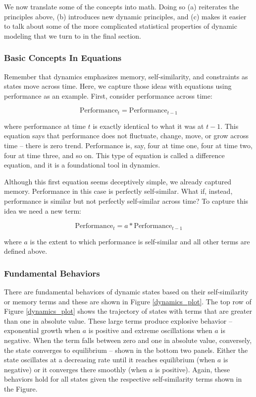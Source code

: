 \documentclass[english,,man]{apa6}
\theoremstyle{definition}
\theoremstyle{definition}
\theoremstyle{definition}
\theoremstyle{remark}
\begin{document}
We now translate some of the concepts into math. Doing so (a) reiterates
the principles above, (b) introduces new dynamic principles, and (c)
makes it easier to talk about some of the more complicated statistical
properties of dynamic modeling that we turn to in the final section.

\hypertarget{basic-concepts-in-equations}{%
\subsubsection{Basic Concepts In
Equations}\label{basic-concepts-in-equations}}

Remember that dynamics emphasizes memory, self-similarity, and
constraints as states move across time. Here, we capture those ideas
with equations using performance as an example. First, consider
performance across time:

\begin{equation}
\textrm{Performance}_{t} = \textrm{Performance}_{t-1}
\end{equation}

\noindent where performance at time \(t\) is exactly identical to what
it was at \(t-1\). This equation says that performance does not
fluctuate, change, move, or grow across time -- there is zero trend.
Performance is, say, four at time one, four at time two, four at time
three, and so on. This type of equation is called a difference equation,
and it is a foundational tool in dynamics.

Although this first equation seems deceptively simple, we already
captured memory. Performance in this case is perfectly self-similar.
What if, instead, performance is similar but not perfectly self-similar
across time? To capture this idea we need a new term:

\begin{equation}
\textrm{Performance}_{t} = a * \textrm{Performance}_{t-1}
\end{equation}

\noindent where \(a\) is the extent to which performance is self-similar
and all other terms are defined above.

\hypertarget{fundamental-behaviors}{%
\subsubsection{Fundamental Behaviors}\label{fundamental-behaviors}}

There are fundamental behaviors of dynamic states based on their
self-similarity or memory terms and these are shown in Figure
\ref{dynamics_plot}. The top row of Figure \ref{dynamics_plot} shows the
trajectory of states with terms that are greater than one in absolute
value. These large terms produce explosive behavior -- exponential
growth when \(a\) is positive and extreme oscillations when \(a\) is
negative. When the term falls between zero and one in absolute value,
conversely, the state converges to equilibrium -- shown in the bottom
two panels. Either the state oscillates at a decreasing rate until it
reaches equilibrium (when \(a\) is negative) or it converges there
smoothly (when \(a\) is positive). Again, these behaviors hold for all
states given the respective self-similarity terms shown in the Figure.
\end{document}
